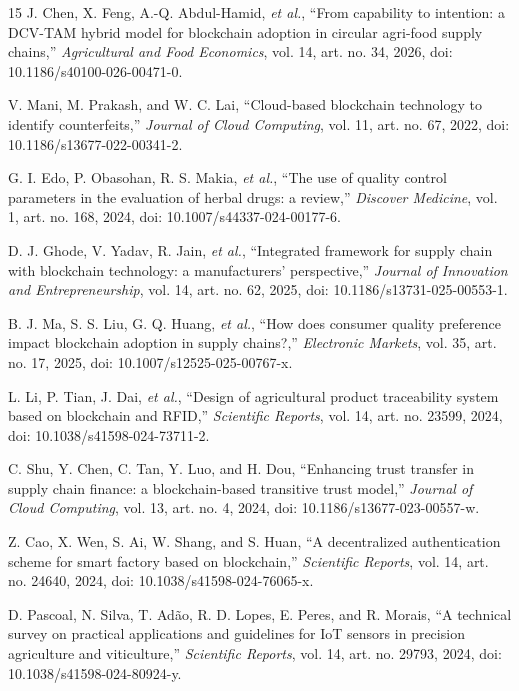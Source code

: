 \documentclass[conference]{IEEEtran}
\begin{document}
\begin{thebibliography}{15}
J. Chen, X. Feng, A.-Q. Abdul-Hamid, \emph{et al.}, ``From capability to intention: a DCV-TAM hybrid model for blockchain adoption in circular agri-food supply chains,'' \emph{Agricultural and Food Economics}, vol. 14, art. no. 34, 2026, doi: 10.1186/s40100-026-00471-0.

V. Mani, M. Prakash, and W. C. Lai, ``Cloud-based blockchain technology to identify counterfeits,'' \emph{Journal of Cloud Computing}, vol. 11, art. no. 67, 2022, doi: 10.1186/s13677-022-00341-2.

G. I. Edo, P. Obasohan, R. S. Makia, \emph{et al.}, ``The use of quality control parameters in the evaluation of herbal drugs: a review,'' \emph{Discover Medicine}, vol. 1, art. no. 168, 2024, doi: 10.1007/s44337-024-00177-6.

D. J. Ghode, V. Yadav, R. Jain, \emph{et al.}, ``Integrated framework for supply chain with blockchain technology: a manufacturers' perspective,'' \emph{Journal of Innovation and Entrepreneurship}, vol. 14, art. no. 62, 2025, doi: 10.1186/s13731-025-00553-1.

B. J. Ma, S. S. Liu, G. Q. Huang, \emph{et al.}, ``How does consumer quality preference impact blockchain adoption in supply chains?,'' \emph{Electronic Markets}, vol. 35, art. no. 17, 2025, doi: 10.1007/s12525-025-00767-x.

L. Li, P. Tian, J. Dai, \emph{et al.}, ``Design of agricultural product traceability system based on blockchain and RFID,'' \emph{Scientific Reports}, vol. 14, art. no. 23599, 2024, doi: 10.1038/s41598-024-73711-2.

C. Shu, Y. Chen, C. Tan, Y. Luo, and H. Dou, ``Enhancing trust transfer in supply chain finance: a blockchain-based transitive trust model,'' \emph{Journal of Cloud Computing}, vol. 13, art. no. 4, 2024, doi: 10.1186/s13677-023-00557-w.

Z. Cao, X. Wen, S. Ai, W. Shang, and S. Huan, ``A decentralized authentication scheme for smart factory based on blockchain,'' \emph{Scientific Reports}, vol. 14, art. no. 24640, 2024, doi: 10.1038/s41598-024-76065-x.

D. Pascoal, N. Silva, T. Ad\~ao, R. D. Lopes, E. Peres, and R. Morais, ``A technical survey on practical applications and guidelines for IoT sensors in precision agriculture and viticulture,'' \emph{Scientific Reports}, vol. 14, art. no. 29793, 2024, doi: 10.1038/s41598-024-80924-y.

\end{thebibliography}
\end{document}
